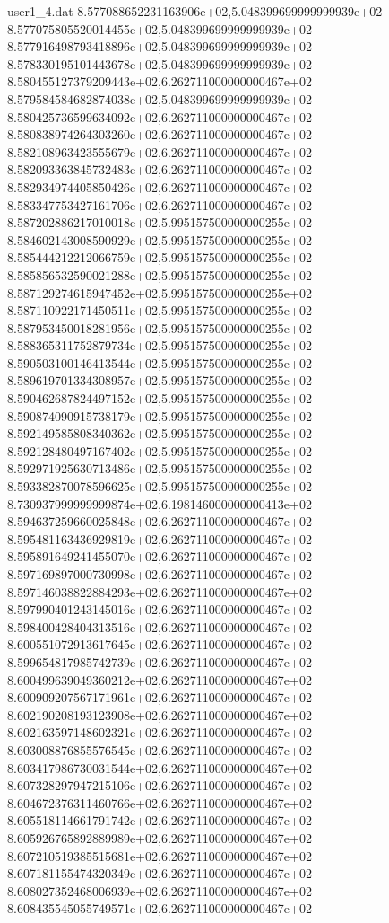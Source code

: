 \begin{filecontents}{user1_4.dat}
8.577088652231163906e+02,5.048399699999999939e+02
8.577075805520014455e+02,5.048399699999999939e+02
8.577916498793418896e+02,5.048399699999999939e+02
8.578330195101443678e+02,5.048399699999999939e+02
8.580455127379209443e+02,6.262711000000000467e+02
8.579584584682874038e+02,5.048399699999999939e+02
8.580425736599634092e+02,6.262711000000000467e+02
8.580838974264303260e+02,6.262711000000000467e+02
8.582108963423555679e+02,6.262711000000000467e+02
8.582093363845732483e+02,6.262711000000000467e+02
8.582934974405850426e+02,6.262711000000000467e+02
8.583347753427161706e+02,6.262711000000000467e+02
8.587202886217010018e+02,5.995157500000000255e+02
8.584602143008590929e+02,5.995157500000000255e+02
8.585444212212066759e+02,5.995157500000000255e+02
8.585856532590021288e+02,5.995157500000000255e+02
8.587129274615947452e+02,5.995157500000000255e+02
8.587110922171450511e+02,5.995157500000000255e+02
8.587953450018281956e+02,5.995157500000000255e+02
8.588365311752879734e+02,5.995157500000000255e+02
8.590503100146413544e+02,5.995157500000000255e+02
8.589619701334308957e+02,5.995157500000000255e+02
8.590462687824497152e+02,5.995157500000000255e+02
8.590874090915738179e+02,5.995157500000000255e+02
8.592149585808340362e+02,5.995157500000000255e+02
8.592128480497167402e+02,5.995157500000000255e+02
8.592971925630713486e+02,5.995157500000000255e+02
8.593382870078596625e+02,5.995157500000000255e+02
8.730937999999999874e+02,6.198146000000000413e+02
8.594637259660025848e+02,6.262711000000000467e+02
8.595481163436929819e+02,6.262711000000000467e+02
8.595891649241455070e+02,6.262711000000000467e+02
8.597169897000730998e+02,6.262711000000000467e+02
8.597146038822884293e+02,6.262711000000000467e+02
8.597990401243145016e+02,6.262711000000000467e+02
8.598400428404313516e+02,6.262711000000000467e+02
8.600551072913617645e+02,6.262711000000000467e+02
8.599654817985742739e+02,6.262711000000000467e+02
8.600499639049360212e+02,6.262711000000000467e+02
8.600909207567171961e+02,6.262711000000000467e+02
8.602190208193123908e+02,6.262711000000000467e+02
8.602163597148602321e+02,6.262711000000000467e+02
8.603008876855576545e+02,6.262711000000000467e+02
8.603417986730031544e+02,6.262711000000000467e+02
8.607328297947215106e+02,6.262711000000000467e+02
8.604672376311460766e+02,6.262711000000000467e+02
8.605518114661791742e+02,6.262711000000000467e+02
8.605926765892889989e+02,6.262711000000000467e+02
8.607210519385515681e+02,6.262711000000000467e+02
8.607181155474320349e+02,6.262711000000000467e+02
8.608027352468006939e+02,6.262711000000000467e+02
8.608435545055749571e+02,6.262711000000000467e+02

\end{filecontents}
